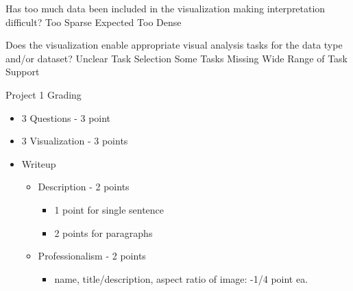 \documentclass[a4paper,12pt]{article}
\begin{document}
	{Has too much data been included in the visualization making 
    	interpretation difficult? } 
	{\choice Too Sparse}
	{\choice Expected}
	{\choice Too Dense} 
        
	{Does the visualization enable appropriate visual analysis tasks for 
    	the data type and/or dataset?}
	{\choice Unclear Task Selection} 
    {\choice Some Tasks Missing} 
    {\choice Wide Range of Task Support}
        
\EndTable  
        




\newpage


\begin{center}
{\huge Project 1 Grading}
\end{center}

\begin{itemize}
\item 3 Questions  - 3 point
\item 3 Visualization - 3 points
\item Writeup
\begin{itemize}
	\item Description - 2 points
		\begin{itemize}
    		\item 1 point for single sentence
            \item 2 points for paragraphs
		\end{itemize}
\item Professionalism - 2 points
		\begin{itemize}
    		\item name, title/description, aspect ratio of image: -1/4 point ea.
   		\end{itemize}

\end{itemize}
\end{itemize}
\end{document}
